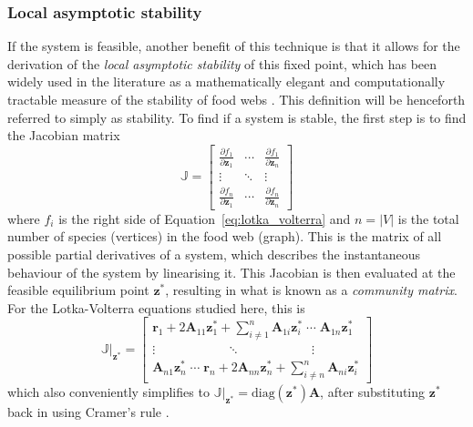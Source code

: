 \subsubsection{Local asymptotic stability}
If the system is feasible, another benefit of this technique is that it allows for the derivation of the \emph{local asymptotic stability} of this fixed point, which has been widely used in the literature as a mathematically elegant and computationally tractable measure of the stability of food webs \citep{May1973, Emmerson2004}. This definition will be henceforth referred to simply as stability. 
To find if a system is stable, the first step is to find the Jacobian matrix
\begin{equation}
  \mathbb{J} = \begin{bmatrix}
    \frac{\partial f_1}{\partial \mathbf{z}_1} & 
    \cdots &
    \frac{\partial f_1}{\partial \mathbf{z}_n} \\
    \vdots &
    \ddots &
    \vdots \\
    \frac{\partial f_n}{\partial \mathbf{z}_1} & 
    \cdots &
    \frac{\partial f_n}{\partial \mathbf{z}_n}
  \end{bmatrix}
\end{equation}
where $f_i$ is the right side of Equation~\eqref{eq:lotka_volterra} and $n=|V|$ is the total number of species (vertices) in the food web (graph).
This is the matrix of all possible partial derivatives of a system, which describes the instantaneous behaviour of the system by linearising it. This Jacobian is then evaluated at the feasible equilibrium point $\mathbf{z}^*$, resulting in what is known as a \emph{community matrix}. For the Lotka-Volterra equations studied here, this is
\begin{equation}
  \mathbb{J}|_\mathbf{z^*} = \begin{bmatrix}
    \mathbf{r}_1 + 2\mathbf{A}_{11}\mathbf{z}_1^* + \sum_{i\neq 1}^n\mathbf{A}_{1i}\mathbf{z}_i^*
    \;\cdots\;
    \mathbf{A}_{1n}\mathbf{z}_1^*\\
    \vdots 
    \qquad\qquad\quad\;\;\ddots\qquad\qquad\quad\;\;
    \vdots \\
    \mathbf{A}_{n1}\mathbf{z}_n^*
    \;\cdots\;
    \mathbf{r}_n + 2\mathbf{A}_{nn}\mathbf{z}_n^* + \sum_{i\neq n}^n\mathbf{A}_{ni}\mathbf{z}_i^* 
  \end{bmatrix}
  \label{eq:jacobian_evaluated}
\end{equation}
which also conveniently simplifies to $\mathbb{J}|_\mathbf{z^*} = \mathrm{diag}(\mathbf{z^*})\mathbf{A}$, after substituting $\mathbf{z^*}$ back in using Cramer's rule \citep{May1973}.
